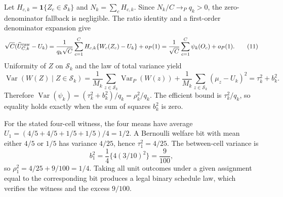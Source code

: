 Let \(H_{c,k}={\mathbf 1}\{Z_c\in\mathcal S_k\}\) and \(N_k=\sum_cH_{c,k}\).  Since \(N_k/C\to_Pq_k>0\), the zero-denominator fallback is negligible.  The ratio identity and a first-order denominator expansion give
\[
 \sqrt C(\widehat U^{\rm raw}_{C,k}-U_k)
 =\frac1{q_k\sqrt C}\sum_{c=1}^CH_{c,k}\{W_c(Z_c)-U_k\}+o_P(1)
 =\frac1{\sqrt C}\sum_{c=1}^C\psi_k(O_c)+o_P(1). \tag{11}
\]
Uniformity of \(Z\) on \(\mathcal S_k\) and the law of total variance yield
\[
 \operatorname{Var}(W(Z)\mid Z\in\mathcal S_k)
 =\frac1{M_k}\sum_{z\in\mathcal S_k}\operatorname{Var}_P(W(z))
 +\frac1{M_k}\sum_{z\in\mathcal S_k}(\mu_z-U_k)^2
 =\tau_k^2+b_k^2.
\]
Therefore \(\operatorname{Var}(\psi_k)=(\tau_k^2+b_k^2)/q_k=\rho_k^2/q_k\).  The efficient bound is \(\tau_k^2/q_k\), so equality holds exactly when the sum of squares \(b_k^2\) is zero.

For the stated four-cell witness, the four means have average \(U_1=(4/5+4/5+1/5+1/5)/4=1/2\).  A Bernoulli welfare bit with mean either \(4/5\) or \(1/5\) has variance \(4/25\), hence \(\tau_1^2=4/25\).  The between-cell variance is
\[
 b_1^2=\frac14\{4(3/10)^2\}=\frac9{100},
\]
 so \(\rho_1^2=4/25+9/100=1/4\).  Taking all unit outcomes under a given assignment equal to the corresponding bit produces a legal binary schedule law, which verifies the witness and the excess \(9/100\).